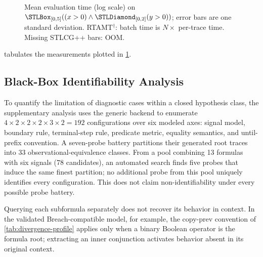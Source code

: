 \begin{figure}[ht]
\centering

\caption{Mean evaluation time (log scale) on
$\Always_{[0,5]}((x>0)\wedge\Eventually_{[0,2]}(y>0))$; error bars are one
standard deviation. RTAMT$^\dagger$: batch time is $N \times$ per-trace time.
Missing STLCG++ bars: OOM.}
\label{fig:scaling}
\end{figure}

 tabulates the measurements plotted in
\cref{fig:scaling}.

\begin{table}[ht]
\centering
\caption{Mean evaluation time (ms) $\pm$ std on the same workload as
\cref{fig:scaling}. $\dagger$: RTAMT is single-trace; batch times are
$N \times$ per-trace (linearity checked at $N \in \{1,8\}$).
OOM: window materialization exceeds memory on the 32\,GB host.}
\label{tab:scaling}

\end{table}

\subsection{Black-Box Identifiability Analysis}
\label{sec:app-identifiability}

To quantify the limitation of diagnostic cases within a closed hypothesis
class, the supplementary analysis uses the generic backend to enumerate
$4\mathbin{\times}2\mathbin{\times}2\mathbin{\times}2\mathbin{\times}3
\mathbin{\times}2=192$ configurations over six modeled axes: signal model,
boundary rule, terminal-step rule, predicate metric, equality semantics, and
until-prefix convention. A seven-probe battery partitions their generated root
traces into 33 observational-equivalence classes. From a pool combining 13
formulas with six signals (78 candidates), an automated search finds five probes
that induce the same finest partition; no additional probe from this pool
uniquely identifies every configuration. This does not claim
non-identifiability under every possible probe battery.

Querying each subformula separately does not recover its behavior in context.
In the validated Breach-compatible model, for example, the copy-prev convention
of \cref{tab:divergence-profile} applies only when a binary Boolean operator is
the formula root; extracting an inner conjunction activates behavior absent in
its original context.

